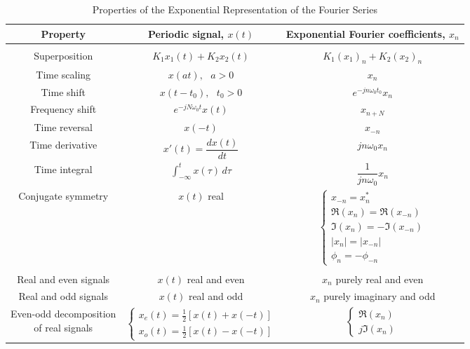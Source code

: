 \documentclass{report}
\begin{document}
\begin{table}[hbt!]
    \centering
    \caption{Properties of the Exponential Representation of the Fourier Series}
    \label{series_prop}
    \begin{tabular}{|c|c|c|}
        \hline
        Property & Periodic signal, $x(t)$ & Exponential Fourier coefficients, $x_n$ \\[0.15cm]
        \hline
        & & \\
        Superposition & $K_1x_1(t)+K_2x_2(t)$ & $K_1(x_1)_n+K_2(x_2)_n$ \\[0.5cm]
        Time scaling & $x(at),\text{ } a>0$ & $x_n$ \\[0.5cm]
        Time shift & $x(t-t_0),\text{ } t_0>0$ & $e^{-jn\omega_0 t_0}x_n$ \\[0.5cm]
        Frequency shift & $e^{-jN\omega_0 t}x(t)$ & $x_{n+N}$ \\[0.5cm]
        Time reversal & $x(-t)$ & $x_{-n}$ \\[0.5cm]
        Time derivative & $x'(t)=\dfrac{dx(t)}{dt}$ & $jn\omega_0 x_n$ \\[0.5cm]
        Time integral & $\displaystyle\int_{-\infty}^{t} x(\tau) \,d\tau$ & $\dfrac{1}{jn\omega_0} x_n$ \\[0.5cm]
        Conjugate symmetry & $x(t)$ real & 
        $\begin{cases}
            x_{-n} = x_n^* \\
            \Re(x_n) = \Re(x_{-n}) \\
            \Im(x_n) = -\Im(x_{-n}) \\
            |x_n| = |x_{-n}| \\
            \phi_n = -\phi_{-n}
        \end{cases}$ \\[0.5cm]
         & & \\[0.25cm]
        Real and even signals & $x(t)$ real and even & $x_n$ purely real and even \\[0.5cm]
        Real and odd signals & $x(t)$ real and odd & $x_n$ purely imaginary and odd \\[0.5cm]
        \shortstack{Even-odd decomposition \\ of real signals} & 
        $\begin{cases}
            x_e(t)=\frac{1}{2}[x(t)+x(-t)] \\
            x_o(t)=\frac{1}{2}[x(t)-x(-t)]
        \end{cases}$ & 
        $\begin{cases}
            \Re(x_n) \\
            j\Im(x_n)
        \end{cases}$ \\[0.5cm]
        \hline
    \end{tabular}
\end{table}
\end{document}
